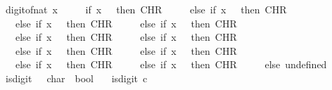 \begin{isabellebody}
\ \ {\isacartoucheopen}digit{\isacharunderscore}{\kern0pt}of{\isacharunderscore}{\kern0pt}nat\ x\ {\isacharequal}{\kern0pt}\isanewline
\ \ \ \ {\isacharparenleft}{\kern0pt}if\ x\ {\isacharequal}{\kern0pt}\ {}\ then\ CHR\ {\isacharprime}{\kern0pt}{\isacharprime}{\kern0pt}{}{\isacharprime}{\kern0pt}{\isacharprime}{\kern0pt}\isanewline
\ \ \ \ else\ if\ x\ {\isacharequal}{\kern0pt}\ {}\ then\ CHR\ {\isacharprime}{\kern0pt}{\isacharprime}{\kern0pt}{}{\isacharprime}{\kern0pt}{\isacharprime}{\kern0pt}\isanewline
\ \ \ \ else\ if\ x\ {\isacharequal}{\kern0pt}\ {}\ then\ CHR\ {\isacharprime}{\kern0pt}{\isacharprime}{\kern0pt}{}{\isacharprime}{\kern0pt}{\isacharprime}{\kern0pt}\isanewline
\ \ \ \ else\ if\ x\ {\isacharequal}{\kern0pt}\ {}\ then\ CHR\ {\isacharprime}{\kern0pt}{\isacharprime}{\kern0pt}{}{\isacharprime}{\kern0pt}{\isacharprime}{\kern0pt}\isanewline
\ \ \ \ else\ if\ x\ {\isacharequal}{\kern0pt}\ {}\ then\ CHR\ {\isacharprime}{\kern0pt}{\isacharprime}{\kern0pt}{}{\isacharprime}{\kern0pt}{\isacharprime}{\kern0pt}\isanewline
\ \ \ \ else\ if\ x\ {\isacharequal}{\kern0pt}\ {}\ then\ CHR\ {\isacharprime}{\kern0pt}{\isacharprime}{\kern0pt}{}{\isacharprime}{\kern0pt}{\isacharprime}{\kern0pt}\isanewline
\ \ \ \ else\ if\ x\ {\isacharequal}{\kern0pt}\ {}\ then\ CHR\ {\isacharprime}{\kern0pt}{\isacharprime}{\kern0pt}{}{\isacharprime}{\kern0pt}{\isacharprime}{\kern0pt}\isanewline
\ \ \ \ else\ if\ x\ {\isacharequal}{\kern0pt}\ {}\ then\ CHR\ {\isacharprime}{\kern0pt}{\isacharprime}{\kern0pt}{}{\isacharprime}{\kern0pt}{\isacharprime}{\kern0pt}\isanewline
\ \ \ \ else\ if\ x\ {\isacharequal}{\kern0pt}\ {}\ then\ CHR\ {\isacharprime}{\kern0pt}{\isacharprime}{\kern0pt}{}{\isacharprime}{\kern0pt}{\isacharprime}{\kern0pt}\isanewline
\ \ \ \ else\ if\ x\ {\isacharequal}{\kern0pt}\ {}\ then\ CHR\ {\isacharprime}{\kern0pt}{\isacharprime}{\kern0pt}{}{\isacharprime}{\kern0pt}{\isacharprime}{\kern0pt}\isanewline
\ \ \ \ else\ undefined{\isacharparenright}{\kern0pt}{\isacartoucheclose}\isanewline
\isanewline
{}\isamarkupfalse%
\ \ is{\isacharunderscore}{\kern0pt}digit\ {\isacharcolon}{\kern0pt}{\isacharcolon}{\kern0pt}\ \ {\isacartoucheopen}char\ {\isasymRightarrow}\ bool{\isacartoucheclose}\ \isanewline
\ \ {\isacartoucheopen}is{\isacharunderscore}{\kern0pt}digit\ c\ {\isacharequal}{\kern0pt}\ \isanewline

\end{isabellebody}
